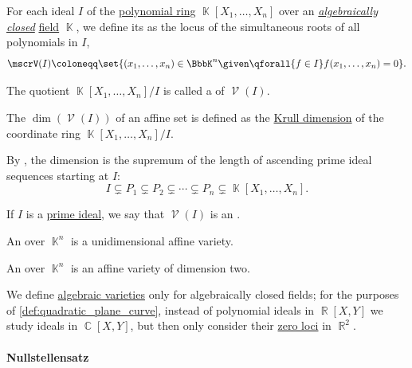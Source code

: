 \begin{definition}\label{def:affine_algebraic_set}
  For each ideal \( I \) of the \hyperref[def:polynomial_algebra]{polynomial ring} \( \BbbK[X_1, \ldots, X_n] \) over an \emph{\hyperref[def:algebraically_closed_field]{algebraically closed}} \hyperref[def:field]{field} \( \BbbK \), we define its  as the locus of the simultaneous roots of all polynomials in \( I \),
  \begin{equation*}
    \mscrV(I) \coloneqq \set{ (x_1, \ldots, x_n) \in \BbbK^n \given \qforall {f \in I} f(x_1, \ldots, x_n) = 0 }.
  \end{equation*}

  \begin{thmenum}
     The quotient \( \BbbK[X_1, \ldots, X_n] / I \) is called a  of \( \mscrV(I) \).

     The  \( \dim(\mscrV(I)) \) of an affine set is defined as the \hyperref[def:krull_dimension]{Krull dimension} of the coordinate ring \( \BbbK[X_1, \ldots, X_n] / I \).

    By , the dimension is the supremum of the length of ascending prime ideal sequences starting at \( I \):
    \begin{equation*}
      I \subsetneq P_1 \subsetneq P_2 \subsetneq \cdots \subsetneq P_n \subsetneq \BbbK[X_1, \ldots, X_n].
    \end{equation*}

     If \( I \) is a \hyperref[def:semiring_ideal/prime]{prime ideal}, we say that \( \mscrV(I) \) is an .

     An  over \( \BbbK^n \) is a unidimensional affine variety.

     An  over \( \BbbK^n \) is an affine variety of dimension two.
  \end{thmenum}
\end{definition}

\begin{remark}\label{rem:real_affine_varieties}
  We define \hyperref[def:affine_algebraic_set/variety]{algebraic varieties} only for algebraically closed fields; for the purposes of \cref{def:quadratic_plane_curve}, instead of polynomial ideals in \( \BbbR[X, Y] \) we study ideals in \( \BbbC[X, Y] \), but then only consider their \hyperref[def:polynomial_root]{zero loci} in \( \BbbR^2 \).
\end{remark}

\paragraph{Nullstellensatz}

\begin{theorem}[Nullstellensatz]\label{thm:hilberts_nullstellensatz}
\end{theorem}
